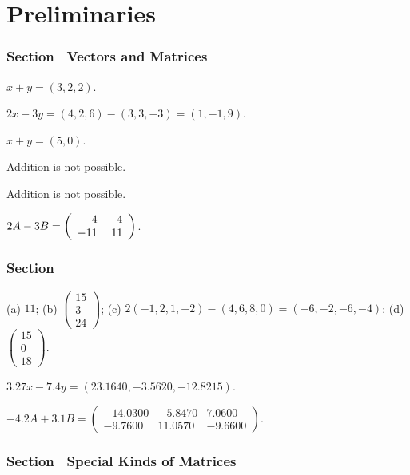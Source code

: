\setcounter{chapter}{0}

\chapter{Preliminaries}

\subsection*{Section~\protect{\ref{S:1.1}} Vectors and Matrices}

 $ x + y = (3,2,2)$.

 $2x - 3y = (4,2,6) - (3,3,-3) = (1,-1,9)$.

 $x + y = (5,0)$.

 Addition is not possible.

 Addition is not possible.

 $2A - 3B = \left(\begin{array}{rr} 4 & -4\\ -11 &11\end{array}\right)$.



\subsection*{Section~\protect{\ref{S:1.2}} \protect{\Matlab}}

(a) $11$;
(b) $\left(\begin{array}{r} 15\\ 3 \\24\end{array} \right)$;
(c) $2(-1,2, 1,-2)- (4, 6, 8, 0)=(-6,-2,-6,-4)$;
(d) $\left(\begin{array}{r} 15 \\ 0 \\ 18 \end{array} \right)$.

  $3.27x - 7.4y = (23.1640, -3.5620, -12.8215)$.

  $-4.2A + 3.1B = \left(\begin{array}{rrr} 
-14.0300 & -5.8470 &    7.0600 \\
 -9.7600 & 11.0570 &   -9.6600\end{array}\right)$.



\newpage
\subsection*{Section~\protect{\ref{S:1.3}} Special Kinds of Matrices}

